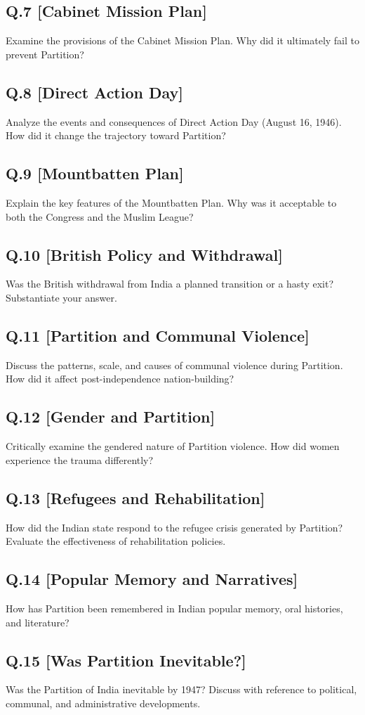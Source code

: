 \subsection*{Q.7 [Cabinet Mission Plan]}
Examine the provisions of the Cabinet Mission Plan. Why did it ultimately fail to prevent Partition?

\subsection*{Q.8 [Direct Action Day]}
Analyze the events and consequences of Direct Action Day (August 16, 1946). How did it change the trajectory toward Partition?

\subsection*{Q.9 [Mountbatten Plan]}
Explain the key features of the Mountbatten Plan. Why was it acceptable to both the Congress and the Muslim League?

\subsection*{Q.10 [British Policy and Withdrawal]}
Was the British withdrawal from India a planned transition or a hasty exit? Substantiate your answer.

\subsection*{Q.11 [Partition and Communal Violence]}
Discuss the patterns, scale, and causes of communal violence during Partition. How did it affect post-independence nation-building?

\subsection*{Q.12 [Gender and Partition]}
Critically examine the gendered nature of Partition violence. How did women experience the trauma differently?

\subsection*{Q.13 [Refugees and Rehabilitation]}
How did the Indian state respond to the refugee crisis generated by Partition? Evaluate the effectiveness of rehabilitation policies.

\subsection*{Q.14 [Popular Memory and Narratives]}
How has Partition been remembered in Indian popular memory, oral histories, and literature?

\subsection*{Q.15 [Was Partition Inevitable?]}
Was the Partition of India inevitable by 1947? Discuss with reference to political, communal, and administrative developments.
